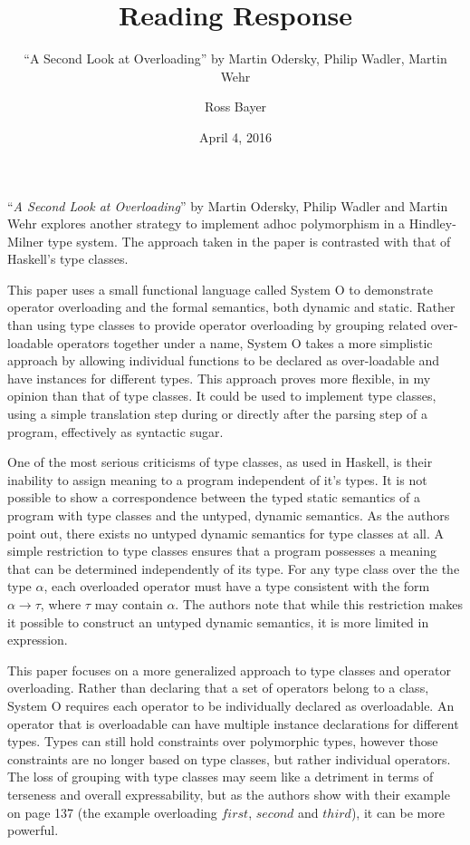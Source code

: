 \documentclass[a4paper,fleqn,notitlepage]{scrartcl}
\title{Reading Response}
\subtitle{\normalfont ``A Second Look at Overloading'' by Martin Odersky, Philip Wadler, Martin Wehr}
\author{Ross Bayer}
\date{April 4, 2016}
\begin{document}
\maketitle


``\textit{A Second Look at Overloading}'' by Martin Odersky, Philip Wadler and
Martin Wehr explores another strategy to implement adhoc polymorphism in a 
Hindley-Milner type system. The approach taken in the paper is contrasted with
that of Haskell's type classes.

This paper uses a small functional language called System O to demonstrate
operator overloading and the formal semantics, both dynamic and static. Rather
than using type classes to provide operator overloading by grouping related
over-loadable operators together under a name, System O takes a more simplistic
approach by allowing individual functions to be declared as over-loadable and
have instances for different types. This approach proves more flexible, in my
opinion than that of type classes. It could be used to implement type classes,
using a simple translation step during or directly after the parsing step of a
program, effectively as syntactic sugar.

One of the most serious criticisms of type classes, as used in Haskell, is their
inability to assign meaning to a program independent of it's types. It is not
possible to show a correspondence between the typed static semantics of a
program with type classes and the untyped, dynamic semantics. As the authors
point out, there exists no untyped dynamic semantics for type classes at all.
A simple restriction to type classes ensures that a program possesses a meaning
that can be determined independently of its type. For any type class over the
the type $\alpha$, each overloaded operator must have a type consistent with
the form $\alpha \rightarrow \tau$, where $\tau$ may contain $\alpha$. The
authors note that while this restriction makes it possible to construct an
untyped dynamic semantics, it is more limited in expression.

This paper focuses on a more generalized approach to type classes and operator
overloading. Rather than declaring that a set of operators belong to a class,
System O requires each operator to be individually declared as overloadable.
An operator that is overloadable can have multiple instance declarations for
different types. Types can still hold constraints over polymorphic types,
however those constraints are no longer based on type classes, but rather
individual operators. The loss of grouping with type classes may seem like a
detriment in terms of terseness and overall expressability, but as the authors
show with their example on page 137 (the example overloading $first$, $second$
and $third$), it can be more powerful.
\end{document}
